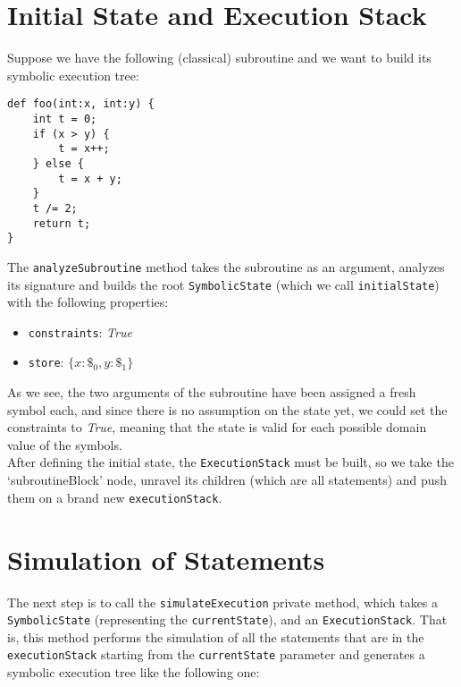 \documentclass[12pt,a4paper]{report}
\theoremstyle{definition}
\theoremstyle{definition}
\theoremstyle{definition}
\begin{document}
\section{Initial State and Execution Stack}
Suppose we have the following (classical) subroutine and we want to build its symbolic execution tree:
\begin{lstlisting}
def foo(int:x, int:y) {
    int t = 0;
    if (x > y) {
        t = x++;
    } else {
        t = x + y;
    }
    t /= 2;
    return t;
}
\end{lstlisting}
The \texttt{analyzeSubroutine} method takes the subroutine as an argument, analyzes its signature and builds the root \texttt{SymbolicState} (which we call \texttt{initialState}) with the following properties:
\begin{itemize}
    \itemsep 0em
    \item \texttt{constraints}: \textit{True}
    \item \texttt{store}: $\{x: \$_0, y: \$_1\}$
\end{itemize}
As we see, the two arguments of the subroutine have been assigned a fresh symbol each, and since there is no assumption on the state yet, we could set the constraints to \textit{True}, meaning that the state is valid for each possible domain value of the symbols.\\
After defining the initial state, the \texttt{ExecutionStack} must be built, so we take the `subroutineBlock' node, unravel its children (which are all statements) and push them on a brand new \texttt{executionStack}.

\section{Simulation of Statements}
The next step is to call the \texttt{simulateExecution} private method, which takes a \texttt{SymbolicState} (representing the \texttt{currentState}), and an \texttt{ExecutionStack}. That is, this method performs the simulation of all the statements that are in the \texttt{executionStack} starting from the \texttt{currentState} parameter and generates a symbolic execution tree like the following one:\\
\end{document}
